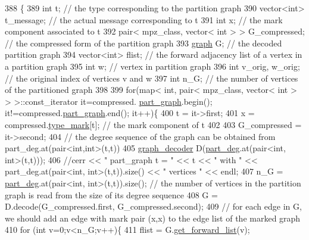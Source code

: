 \begin{DoxyCode}
388 \{
389   \textcolor{keywordtype}{int} t; \textcolor{comment}{// the type corresponding to the partition graph}
390   vector<int> t\_message; \textcolor{comment}{// the actual message corresponding to t}
391   \textcolor{keywordtype}{int} x; \textcolor{comment}{// the mark component associated to t}
392   pair< mpz\_class, vector< int > > G\_compressed; \textcolor{comment}{// the compressed form of the partition graph}
393   \hyperlink{classgraph}{graph} G; \textcolor{comment}{// the decoded partition graph}
394   vector<int> flist; \textcolor{comment}{// the forward adjacency list of a vertex in a partition graph}
395   \textcolor{keywordtype}{int} w; \textcolor{comment}{// vertex in partition graph}
396   \textcolor{keywordtype}{int} v\_orig, w\_orig; \textcolor{comment}{// the original index of vertices v and w}
397   \textcolor{keywordtype}{int} n\_G; \textcolor{comment}{// the number of vertices of the partitioned graph }
398 
399   \textcolor{keywordflow}{for}(map< \textcolor{keywordtype}{int}, pair< mpz\_class, vector< int > > >::const\_iterator it=compressed.
      \hyperlink{classmarked__graph__compressed_ae179a4737e6eab905c18a94d44ef64b7}{part\_graph}.begin(); it!=compressed.\hyperlink{classmarked__graph__compressed_ae179a4737e6eab905c18a94d44ef64b7}{part\_graph}.end(); it++)\{
400     t = it->first;
401     x = compressed.\hyperlink{classmarked__graph__compressed_a86b00223525703e973415cbc9c94da68}{type\_mark}[t]; \textcolor{comment}{// the mark component of t }
402 
403     G\_compressed = it->second;
404     \textcolor{comment}{// the degree sequence of the graph can be obtained from part\_deg.at(pair<int,int>(t,t))}
405     \hyperlink{classgraph__decoder}{graph\_decoder} D(\hyperlink{classmarked__graph__decoder_a6882e96fcad9abb10e72f1398814824a}{part\_deg}.at(pair<int, int>(t,t)));
406     \textcolor{comment}{//cerr << " part\_graph t = " << t << " with " << part\_deg.at(pair<int, int>(t,t)).size() << " vertices
       " << endl;}
407     n\_G = \hyperlink{classmarked__graph__decoder_a6882e96fcad9abb10e72f1398814824a}{part\_deg}.at(pair<int, int>(t,t)).size(); \textcolor{comment}{// the number of vertices in the partition graph
       is read from the size of its degree sequence}
408     G = D.decode(G\_compressed.first, G\_compressed.second);
409     \textcolor{comment}{// for each edge in G, we should add an edge with mark pair (x,x) to the edge list of the marked graph}
410     \textcolor{keywordflow}{for} (\textcolor{keywordtype}{int} v=0;v<n\_G;v++)\{
411       flist = G.\hyperlink{classgraph_aa8fbee52a7b3604dbbd9175040c7ead5}{get\_forward\_list}(v);

\end{DoxyCode}
